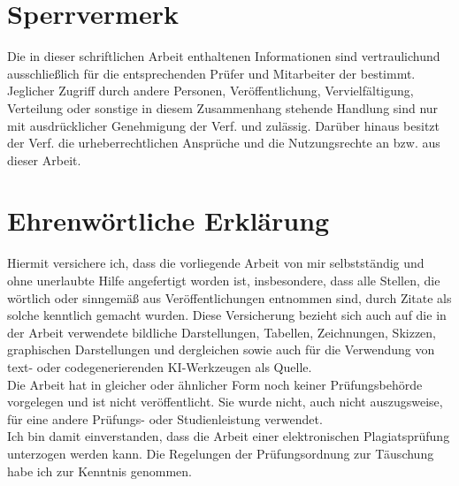 \documentclass[a4paper, 11pt, german ]{article}
\def\True{1}
\begin{document}
\newpage
{}
\tableofcontents




\if\Sperrvermerk \True
\newpage
 \section*{Sperrvermerk}
 Die in dieser schriftlichen Arbeit enthaltenen Informationen sind vertraulichund ausschließlich
 für die entsprechenden Prüfer und Mitarbeiter der \Hochschulname bestimmt.
Jeglicher Zugriff durch andere Personen, Veröffentlichung, Vervielfältigung,
Verteilung oder sonstige in diesem Zusammenhang stehende Handlung sind nur mit ausdrücklicher
Genehmigung der Verf. und \Firma\space zulässig. Darüber hinaus besitzt der
Verf. die urheberrecht\-lichen Ansprüche und \Firma\space die Nutzungsrechte
an bzw. aus dieser Arbeit.
\newpage
\fi




\if\Makefile\True
  
  
  
\else
  
  
  
  
\fi

\printbibliography


\newpage
\section*{Ehrenwörtliche Erklärung}
Hiermit versichere ich, dass die vorliegende Arbeit von mir selbstständig und ohne unerlaubte Hilfe
angefertigt worden ist, insbesondere, dass alle Stellen, die wörtlich oder sinngemäß aus
Veröffentlichungen entnommen sind, durch Zitate als solche kenntlich gemacht wurden.
Diese Versicherung bezieht sich auch auf die in der Arbeit verwendete bildliche Darstellungen,
Tabellen, Zeichnungen, Skizzen, graphischen Darstellungen und dergleichen sowie auch für die
Verwendung von text- oder codegenerierenden KI-Werkzeugen als Quelle.
\vspace{1ex}\\
Die Arbeit hat in gleicher oder ähnlicher Form noch keiner Prüfungsbehörde vorgelegen und ist nicht
veröffentlicht. Sie wurde nicht, auch nicht auszugsweise, für eine andere Prüfungs- oder
Studienleistung verwendet.
\vspace{1ex}\\
Ich bin damit einverstanden, dass die Arbeit einer elektronischen Plagiatsprüfung unterzogen werden
kann. Die Regelungen der Prüfungsordnung zur Täuschung habe ich zur Kenntnis genommen.

\begin{Form}
\end{Form}
\end{document}
